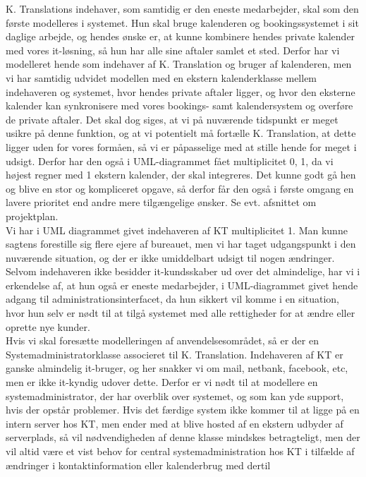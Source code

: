 \documentclass[12pt]{article}   %
\begin{document}
K. Translations indehaver, som samtidig er den eneste medarbejder, skal som
den første modelleres i systemet. Hun skal bruge kalenderen og
bookingssystemet i sit daglige arbejde, og hendes ønske er, at kunne kombinere
hendes private kalender med vores it-løsning, så hun har alle sine aftaler
samlet et sted. Derfor har vi modelleret hende som indehaver af K.
Translation og bruger af kalenderen, men vi har samtidig udvidet modellen med
en ekstern kalenderklasse mellem indehaveren og systemet, hvor hendes private
aftaler ligger, og hvor den eksterne kalender kan synkronisere med vores
bookings- samt kalendersystem og overføre de private aftaler. Det skal dog
siges, at vi på nuværende tidspunkt er meget usikre på denne funktion, og at
vi potentielt må fortælle K. Translation, at dette ligger uden for vores
formåen, så vi er påpasselige med at stille hende for meget i udsigt. Derfor
har den også i UML-diagrammet fået multiplicitet 0, 1, da vi højest regner med
1 ekstern kalender, der skal integreres. Det kunne godt gå hen og blive en stor
og kompliceret opgave, så derfor får den også i første omgang en lavere prioritet 
end andre mere tilgængelige ønsker. Se evt. afsnittet om projektplan.\\
Vi har i UML diagrammet givet indehaveren af KT multiplicitet 1.
Man kunne sagtens forestille sig flere ejere af bureauet, men vi har taget
udgangspunkt i den nuværende situation, og der er ikke umiddelbart udsigt til 
nogen ændringer. Selvom indehaveren ikke besidder it-kundsskaber ud over det
almindelige, har vi i erkendelse af, at hun også er eneste medarbejder, i
UML-diagrammet givet hende adgang til administrationsinterfacet, da hun sikkert
vil komme i en situation, hvor hun selv er nødt til at tilgå systemet med alle
rettigheder for at ændre eller oprette nye kunder. \\
Hvis vi skal foresætte modelleringen af anvendelsesområdet, så er der en
Systemadministratorklasse associeret til K. Translation. Indehaveren af KT
er ganske almindelig it-bruger, og her snakker vi om mail, netbank, facebook,
etc, men er ikke it-kyndig udover dette. Derfor er vi nødt til at modellere en
systemadministrator, der har overblik over systemet, og som kan yde support,
hvis der opstår problemer. Hvis det færdige system ikke kommer til at ligge på
en intern server hos KT, men ender med at blive hosted af en ekstern udbyder 
af serverplads, så vil nødvendigheden af denne klasse mindskes betragteligt,
men der vil altid være et vist behov for central systemadministration hos KT i
tilfælde af ændringer i kontaktinformation eller kalenderbrug med dertil
\end{document}
